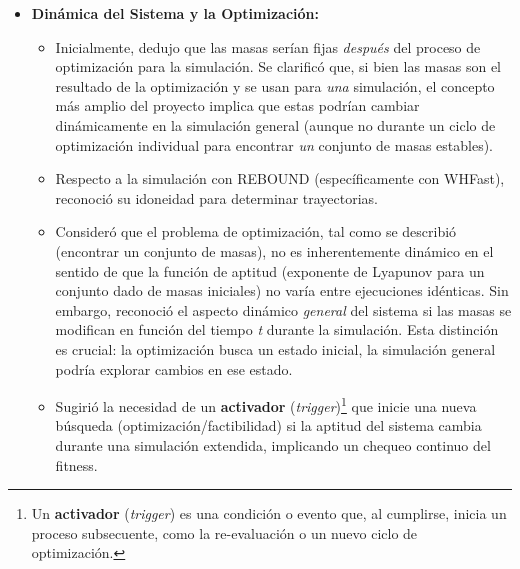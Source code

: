 \begin{itemize}
    \item \textbf{Dinámica del Sistema y la Optimización:}
    \begin{itemize}
        \item Inicialmente, dedujo que las masas serían fijas \textit{después} del proceso de optimización para la simulación. Se clarificó que, si bien las masas son el resultado de la optimización y se usan para \textit{una} simulación, el concepto más amplio del proyecto implica que estas podrían cambiar dinámicamente en la simulación general (aunque no durante un ciclo de optimización individual para encontrar \textit{un} conjunto de masas estables).
        \item Respecto a la simulación con REBOUND (específicamente con WHFast), reconoció su idoneidad para determinar trayectorias.
        \item Consideró que el problema de optimización, tal como se describió (encontrar un conjunto de masas), no es inherentemente dinámico en el sentido de que la función de aptitud (exponente de Lyapunov para un conjunto dado de masas iniciales) no varía entre ejecuciones idénticas. Sin embargo, reconoció el aspecto dinámico \textit{general} del sistema si las masas se modifican en función del tiempo \textit{t} durante la simulación. Esta distinción es crucial: la optimización busca un estado inicial, la simulación general podría explorar cambios en ese estado.
        \item Sugirió la necesidad de un \textbf{activador} (\textit{trigger})\footnote{Un \textbf{activador} (\textit{trigger}) es una condición o evento que, al cumplirse, inicia un proceso subsecuente, como la re-evaluación o un nuevo ciclo de optimización.} que inicie una nueva búsqueda (optimización/factibilidad) si la aptitud del sistema cambia durante una simulación extendida, implicando un chequeo continuo del fitness.
    \end{itemize}


\end{itemize}
